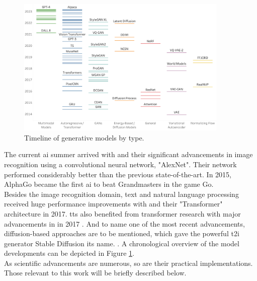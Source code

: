 \documentclass[
  a4paper,  %
  twoside,  %
  bibliography=totoc,
  headsepline,
  cleardoublepage=empty,
  parskip=half,
  draft=false
]{scrbook}
\begin{document}
\begin{figure}[h]
  \centering
  \includegraphics[width=0.9\textwidth]{./graphics/images/Timeline_of_generative_models_by_type.png}
  \caption{Timeline of generative models by type. \citet{garcia-penalvoWhatWeMean2023}}
  \label{fig:timeline-models}
\end{figure}
The current \gls{ai} summer arrived with \citet{krizhevskyImageNetClassificationDeep2012} and their significant advancements in image recognition using a convolutional neural network, "AlexNet". Their network performed considerably better than the previous state-of-the-art. In 2015, AlphaGo became the first \gls{ai} to beat Grandmasters in the game Go. \\
Besides the image recognition domain, text and natural language processing received huge performance improvements with  and their "Transformer" architecture in 2017. \gls{tts} also benefited from transformer research with major advancements in  in 2017 \cite{wangTacotronEndtoEndSpeech2017}. And to name one of the most recent advancements, diffusion-based approaches are to be mentioned, which gave the powerful \gls{t2i} generator Stable Diffusion its name. \cite{rombachHighResolutionImageSynthesis2022}. A chronological overview of the model developments can be depicted in Figure \ref{fig:timeline-models}. \\
As scientific advancements are numerous, so are their practical implementations. Those relevant to this work will be briefly described below.
\end{document}
